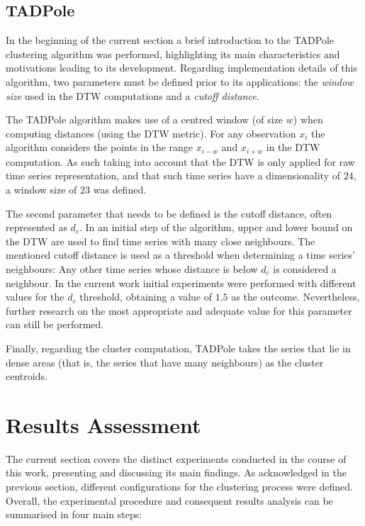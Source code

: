 \documentclass[9pt,journal,compsoc]{IEEEtran}
\begin{document}
\subsection{TADPole}

In the beginning of the current section a brief introduction to the TADPole clustering algorithm was performed, highlighting its main characteristics and motivations leading to its development. Regarding implementation details of this algorithm, two parameters must be defined prior to its applications: the \emph{window size} used in the DTW computations and a \emph{cutoff distance}.

The TADPole algorithm makes use of a centred window (of size $w$) when computing distances (using the DTW metric). For any observation $x_{i}$ the algorithm considers the points in the range $x_{i-w}$ and $x_{i+w}$ in the DTW computation. As such taking into account that the DTW is only applied for raw time series representation, and that such time series have a dimensionality of $24$, a window size of $23$ was defined.

The second parameter that needs to be defined is the cutoff distance, often represented as $d_{c}$. In an initial step of the algorithm, upper and lower bound on the DTW are used to find time series with many close neighbours. The mentioned cutoff distance is used as a threshold when determining a time series' neighbours: Any other time series whose distance is below $d_{c}$ is considered a neighbour. In the current work initial experiments were performed with different values for the $d_{c}$ threshold, obtaining a value of $1.5$ as the outcome. Nevertheless, further research on the most appropriate and adequate value for this parameter can still be performed.

Finally, regarding the cluster computation, TADPole takes the series that lie in dense areas (that is, the series that have many neighbours) as the cluster centroids.

\section{Results Assessment}
\label{results_assessment}

The current section covers the distinct experiments conducted in the course of this work, presenting and discussing its main findings. As acknowledged in the previous section, different configurations for the clustering process were defined. Overall, the experimental procedure and consequent results analysis can be summarised in four main steps:
\end{document}

